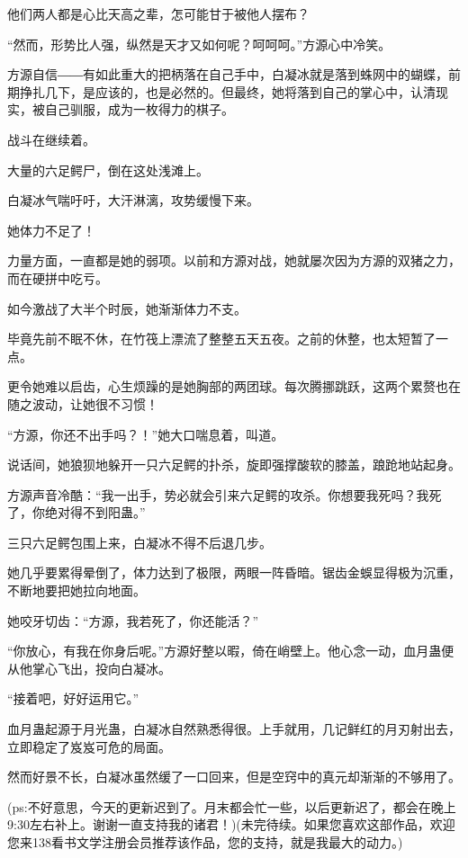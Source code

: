 \begin{this_body}
他们两人都是心比天高之辈，怎可能甘于被他人摆布？

“然而，形势比人强，纵然是天才又如何呢？呵呵呵。”方源心中冷笑。

方源自信――有如此重大的把柄落在自己手中，白凝冰就是落到蛛网中的蝴蝶，前期挣扎几下，是应该的，也是必然的。但最终，她将落到自己的掌心中，认清现实，被自己驯服，成为一枚得力的棋子。

战斗在继续着。

大量的六足鳄尸，倒在这处浅滩上。

白凝冰气喘吁吁，大汗淋漓，攻势缓慢下来。

她体力不足了！

力量方面，一直都是她的弱项。以前和方源对战，她就屡次因为方源的双猪之力，而在硬拼中吃亏。

如今激战了大半个时辰，她渐渐体力不支。

毕竟先前不眠不休，在竹筏上漂流了整整五天五夜。之前的休整，也太短暂了一点。

更令她难以启齿，心生烦躁的是她胸部的两团球。每次腾挪跳跃，这两个累赘也在随之波动，让她很不习惯！

“方源，你还不出手吗？！”她大口喘息着，叫道。

说话间，她狼狈地躲开一只六足鳄的扑杀，旋即强撑酸软的膝盖，踉跄地站起身。

方源声音冷酷：“我一出手，势必就会引来六足鳄的攻杀。你想要我死吗？我死了，你绝对得不到阳蛊。”

三只六足鳄包围上来，白凝冰不得不后退几步。

她几乎要累得晕倒了，体力达到了极限，两眼一阵昏暗。锯齿金蜈显得极为沉重，不断地要把她拉向地面。

她咬牙切齿：“方源，我若死了，你还能活？”

“你放心，有我在你身后呢。”方源好整以暇，倚在峭壁上。他心念一动，血月蛊便从他掌心飞出，投向白凝冰。

“接着吧，好好运用它。”

血月蛊起源于月光蛊，白凝冰自然熟悉得很。上手就用，几记鲜红的月刃射出去，立即稳定了岌岌可危的局面。

然而好景不长，白凝冰虽然缓了一口回来，但是空窍中的真元却渐渐的不够用了。

(ps:不好意思，今天的更新迟到了。月末都会忙一些，以后更新迟了，都会在晚上9:30左右补上。谢谢一直支持我的诸君！)(未完待续。如果您喜欢这部作品，欢迎您来138看书文学注册会员推荐该作品，您的支持，就是我最大的动力。)

\end{this_body}

